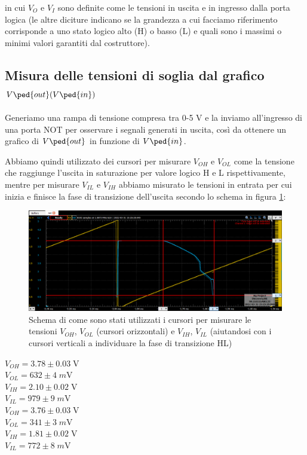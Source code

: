 \documentclass[10pt, a4paper, italian]{article}
\begin{document}
in cui $V_O$ e $V_I$ sono definite come le tensioni in uscita e in ingresso
dalla porta logica (le altre diciture indicano se la grandezza a cui facciamo
riferimento corrisponde a uno stato logico alto (H) o basso (L) e quali sono
i massimi o minimi valori garantiti dal costruttore).

\subsection{Misura delle tensioni di soglia dal grafico
$V\ped{out}(V\ped{in})$}
Generiamo una rampa di tensione compresa tra 0-5 V e la inviamo
all'ingresso di una porta NOT per osservare i segnali generati in uscita,
così da ottenere un grafico di $V\ped{out}$ in funzione di $V\ped{in}$.

Abbiamo quindi utilizzato dei cursori per misurare $V_{OH}$ e $V_{OL}$ come la tensione che raggiunge l'uscita in saturazione per valore logico H e L rispettivamente, mentre per misurare $V_{IL}$ e $V_{IH}$ abbiamo misurato le tensioni in entrata per cui inizia e finisce la fase di transizione dell'uscita secondo lo schema in figura \ref{fig: trans}:
\begin{figure}
	\includegraphics[scale=0.4]{trans}
	\caption{Schema di come sono stati utilizzati i cursori per misurare le tensioni $V_{OH}$, $V_{OL}$ (cursori orizzontali) e $V_{IH}$, $V_{IL}$ (aiutandosi con i cursori verticali a individuare la fase di transizione HL)}
	\label{fig: trans}
\end{figure}
\begin{multicols}{2}
    \centering
    $V_{OH} = 3.78\pm 0.03\; \si{\V}$ \\
	$V_{OL} = 632\pm 4 \; \si{m\V}$ \\
	$V_{IH} = 2.10 \pm 0.02 \; \si{\V} $\\
	$V_{IL} = 979 \pm 9\; \si{m\V} $\\
    
    $V_{OH} = 3.76\pm 0.03\; \si{\V}$ \\
	$V_{OL} = 341\pm 3 \; \si{m\V}$ \\
	$V_{IH} = 1.81 \pm 0.02 \; \si{\V} $\\
	$V_{IL} = 772 \pm 8\; \si{m\V} $\\
\end{multicols}
\end{document}
